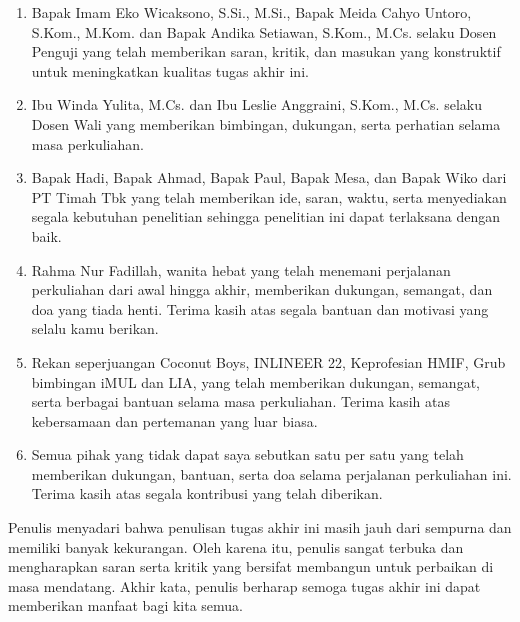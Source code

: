 \begin{justifying}
\begin{enumerate}
		\item Bapak Imam Eko Wicaksono, S.Si., M.Si., Bapak Meida Cahyo Untoro, S.Kom., M.Kom. dan Bapak Andika Setiawan, S.Kom., M.Cs. selaku Dosen Penguji yang telah memberikan saran, kritik, dan masukan yang konstruktif untuk meningkatkan kualitas tugas akhir ini.
		\item Ibu Winda Yulita, M.Cs. dan Ibu Leslie Anggraini, S.Kom., M.Cs. selaku Dosen Wali yang memberikan bimbingan, dukungan, serta perhatian selama masa perkuliahan.
		\item Bapak Hadi, Bapak Ahmad, Bapak Paul, Bapak Mesa, dan Bapak Wiko dari PT Timah Tbk yang telah memberikan ide, saran, waktu, serta menyediakan segala kebutuhan penelitian sehingga penelitian ini dapat terlaksana dengan baik.
		\item Rahma Nur Fadillah, wanita hebat yang telah menemani perjalanan perkuliahan dari awal hingga akhir, memberikan dukungan, semangat, dan doa yang tiada henti. Terima kasih atas segala bantuan dan motivasi yang selalu kamu berikan.
		\item Rekan seperjuangan Coconut Boys, INLINEER 22, Keprofesian HMIF, Grub bimbingan iMUL dan LIA, yang telah memberikan dukungan, semangat, serta berbagai bantuan selama masa perkuliahan. Terima kasih atas kebersamaan dan pertemanan yang luar biasa.
		\item Semua pihak yang tidak dapat saya sebutkan satu per satu yang telah memberikan dukungan, bantuan, serta doa selama perjalanan perkuliahan ini. Terima kasih atas segala kontribusi yang telah diberikan.
	\end{enumerate} \par
	Penulis menyadari bahwa penulisan tugas akhir ini masih jauh dari sempurna dan memiliki banyak kekurangan. Oleh karena itu, penulis sangat terbuka dan mengharapkan saran serta kritik yang bersifat membangun untuk perbaikan di masa mendatang. Akhir kata, penulis berharap semoga tugas akhir ini dapat memberikan manfaat bagi kita semua.
	\vfill
	
\end{justifying}
\clearpage





